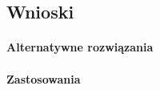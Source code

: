 \documentclass{article}
\begin{document}
\subsection{Wnioski}
\paragraph{Alternatywne rozwiązania}
\paragraph{Zastosowania}
\end{document}
